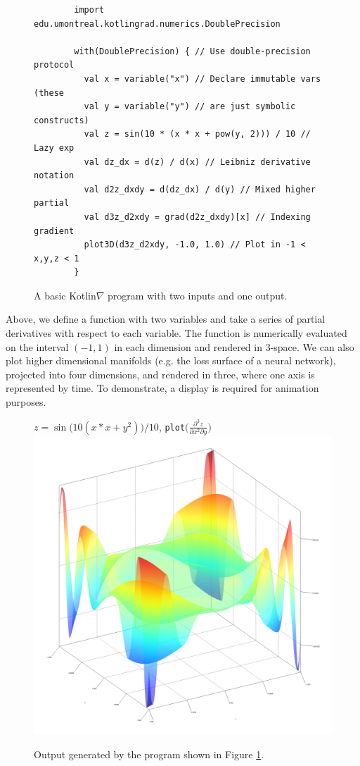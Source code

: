 \documentclass[12pt,initial,twoside,maitrise]{dms}
\numberwithin{equation}{section}
\numberwithin{table}{chapter}
\numberwithin{figure}{chapter}
\begin{document}
\begin{figure}[!htb]
    \begin{verbatim}
        import edu.umontreal.kotlingrad.numerics.DoublePrecision

        with(DoublePrecision) { // Use double-precision protocol
          val x = variable("x") // Declare immutable vars (these
          val y = variable("y") // are just symbolic constructs)
          val z = sin(10 * (x * x + pow(y, 2))) / 10 // Lazy exp
          val dz_dx = d(z) / d(x) // Leibniz derivative notation
          val d2z_dxdy = d(dz_dx) / d(y) // Mixed higher partial
          val d3z_d2xdy = grad(d2z_dxdy)[x] // Indexing gradient
          plot3D(d3z_d2xdy, -1.0, 1.0) // Plot in -1 < x,y,z < 1
        }
    \end{verbatim}

    \caption{A basic Kotlin$\nabla$ program with two inputs and one output.}
    \label{label:fig1}
\end{figure}

Above, we define a function with two variables and take a series of partial derivatives with respect to each variable. The function is numerically evaluated on the interval $(-1, 1)$ in each dimension and rendered in 3-space. We can also plot higher dimensional manifolds (e.g. the loss surface of a neural network), projected into four dimensions, and rendered in three, where one axis is represented by time. To demonstrate, a display is required for animation purposes.

\begin{figure}[!htb]
    \centering $z = \sin{\big(10(x*x + y^2)\big)} / 10$, \texttt{plot}$\Big(\frac{\partial^3z}{\partial{x^2}\partial{y}}\Big)$
    \includegraphics[scale=0.43]{plot_result.png}
    \caption{Output generated by the program shown in Figure \ref{label:fig1}.}
\end{figure}
\end{document}
